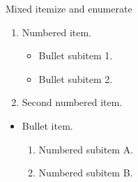 \documentclass[14pt,t]{beamer-accessibility}
\begin{document}
\begin{frame}{Mixed itemize and enumerate}
\begin{enumerate}
\item Numbered item.
  \begin{itemize}
  \item Bullet subitem 1.
  \item Bullet subitem 2.
  \end{itemize}
\item Second numbered item.
\end{enumerate}

\begin{itemize}
\item Bullet item.
  \begin{enumerate}
  \item Numbered subitem A.
  \item Numbered subitem B.
  \end{enumerate}
\end{itemize}
\end{frame}
\end{document}
